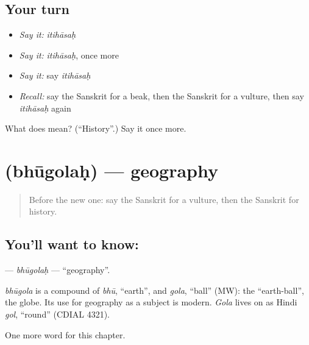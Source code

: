 \subsection*{Your turn}
\begin{itemize}
\raggedright
  \item \emph{Say it:} \emph{itihāsaḥ}
  \item \emph{Say it:} \emph{itihāsaḥ}, once more
  \item \emph{Say it:} say \emph{itihāsaḥ}
  \item \emph{Recall:} say the Sanskrit for a beak, then the Sanskrit for a vulture, then say \emph{itihāsaḥ} again
\end{itemize}

\begin{tcolorbox}[breakable,colback=teal!4,colframe=teal!35!black,title={Before you move on}]
What does  mean? (\textquotedblleft{}History\textquotedblright{}.) Say it once more.
\end{tcolorbox}
\section[\texorpdfstring{\sk{भूगोलः} (bhūgolaḥ)}{भूगोलः (bhūgolaḥ)}]{ (bhūgolaḥ) — geography}

\label{lesson:SA-C228-bhugolah}



\begin{quote}
Before the new one: say the Sanskrit for a vulture, then the Sanskrit for history.
\end{quote}

\subsection*{You'll want to know: }
\textbf{} — \emph{bhūgolaḥ} — \textquotedblleft{}geography\textquotedblright{}.

\begin{cousinweb}
\emph{bhūgola} is a compound of \emph{bhū}, \textquotedblleft{}earth\textquotedblright{}, and \emph{gola}, \textquotedblleft{}ball\textquotedblright{} (MW): the \textquotedblleft{}earth-ball\textquotedblright{}, the globe. Its use for geography as a subject is modern. \emph{Gola} lives on as Hindi \emph{gol}, \textquotedblleft{}round\textquotedblright{} (CDIAL 4321).
\end{cousinweb}

\begin{grammarlens}[title={What you've built}]
One more word for this chapter.
\end{grammarlens}

